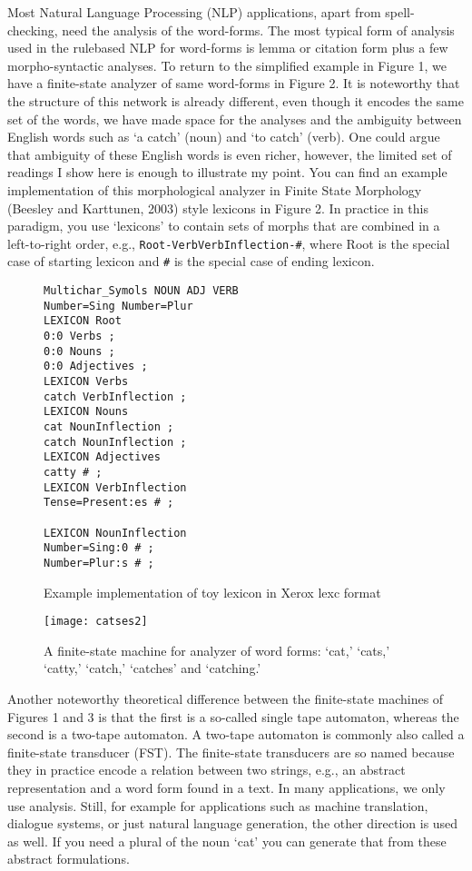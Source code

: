\documentclass[free]{flammie}
\begin{document}
Most Natural Language Processing (NLP) applications, apart from spell-checking,
need the analysis of the word-forms. The most typical form of analysis used in
the rulebased NLP for word-forms is lemma or citation form plus a few
morpho-syntactic analyses.  To return to the simplified example in Figure 1, we
have a finite-state analyzer of same word-forms in Figure 2. It is noteworthy
that the structure of this network is already different, even though it encodes
the same set of the words, we have made space for the analyses and the ambiguity
between English words such as ‘a catch’ (noun) and ‘to catch’ (verb). One could
argue that ambiguity of these English words is even richer, however, the limited
set of readings I show here is enough to illustrate my point. You can find an
example implementation of this morphological analyzer in Finite State Morphology
(Beesley and Karttunen, 2003) style lexicons in Figure 2. In practice in this
paradigm, you use ‘lexicons’ to contain sets of morphs that are combined in a
left-to-right order, e.g., \verb|Root-VerbVerbInflection-#|, where Root is the
special case of starting lexicon and \verb|#| is the special case of ending
lexicon.

\begin{figure}
\begin{verbatim}
Multichar_Symols NOUN ADJ VERB
Number=Sing Number=Plur
LEXICON Root
0:0 Verbs ;
0:0 Nouns ;
0:0 Adjectives ;
LEXICON Verbs
catch VerbInflection ;
LEXICON Nouns
cat NounInflection ;
catch NounInflection ;
LEXICON Adjectives
catty # ;
LEXICON VerbInflection
Tense=Present:es # ;

LEXICON NounInflection
Number=Sing:0 # ;
Number=Plur:s # ;
\end{verbatim}
    \caption{Example implementation of toy lexicon in Xerox lexc
    format\label{fig:lexc}}
\end{figure}

\begin{figure}
    \texttt{[image: catses2]}
    \caption{A finite-state machine for analyzer of word forms: ‘cat,’ ‘cats,’ ‘catty,’
    ‘catch,’ ‘catches’ and ‘catching.’\label{fig:bar}}
\end{figure}

Another noteworthy theoretical difference between the finite-state machines of Figures 1
and 3 is that the first is a so-called single tape automaton, whereas the second is a two-tape
automaton. A two-tape automaton is commonly also called a finite-state transducer (FST).
The finite-state transducers are so named because they in practice encode a relation
between two strings, e.g., an abstract representation and a word form found in a text. In
many applications, we only use analysis. Still, for example for applications such as machine
translation, dialogue systems, or just natural language generation, the other direction is used
as well. If you need a plural of the noun ‘cat’ you can generate that from these abstract
formulations.
\end{document}
